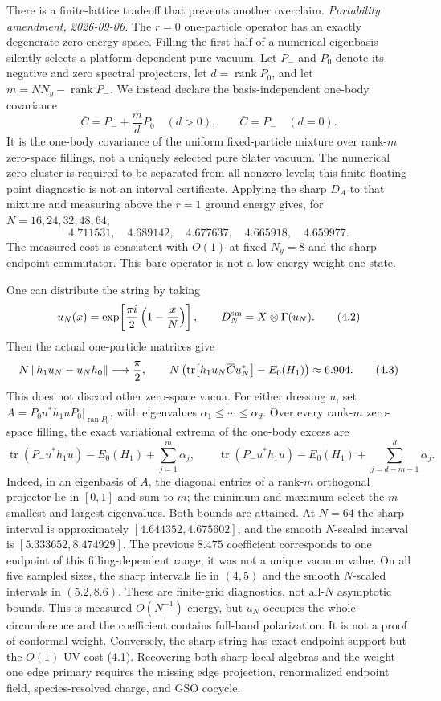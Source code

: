 There is a finite-lattice tradeoff that prevents another overclaim.
\emph{Portability amendment, 2026-09-06.}  The $r=0$ one-particle operator
has an exactly degenerate zero-energy space.  Filling the first half of a
numerical eigenbasis silently selects a platform-dependent pure vacuum.
Let $P_-$ and $P_0$ denote its negative and zero spectral projectors, let
$d=\operatorname{rank}P_0$, and let $m=N N_y-\operatorname{rank}P_-$.
We instead declare the basis-independent one-body covariance
\[
 \overline C=P_-+\frac md P_0
 \quad(d>0),\qquad \overline C=P_-\quad(d=0).
\]
It is the one-body covariance of the uniform fixed-particle mixture over
rank-$m$ zero-space fillings, not a uniquely selected pure Slater vacuum.
The numerical zero cluster is required to be separated from all nonzero
levels; this finite floating-point diagnostic is not an interval certificate.
Applying the sharp $D_A$ to that mixture and measuring above the $r=1$
ground energy gives, for $N=16,24,32,48,64$,
\[
 4.711531,\quad4.689142,\quad4.677637,\quad4.665918,\quad4.659977.
\tag{4.1}
\]
The measured cost is consistent with $O(1)$ at fixed $N_y=8$ and the sharp endpoint
commutator.  This bare operator is not a low-energy weight-one state.

One can distribute the string by taking
\[
 u_N(x)=\exp\!\left[\frac{\pi i}{2}\left(1-\frac{x}{N}\right)\right],
 \qquad D_N^{\rm sm}=X\otimes\Gamma(u_N).
\tag{4.2}
\]
Then the actual one-particle matrices give
\[
 N\left\lVert h_1u_N-u_Nh_0\right\rVert\longrightarrow\frac\pi2,\qquad
 N\left(\operatorname{tr}\!\left[h_1u_N\overline C u_N^*\right]
 -E_0(H_1)\right)\approx6.904.
\tag{4.3}
\]
This does not discard other zero-space vacua.  For either dressing $u$, set
$A=P_0u^*h_1uP_0|_{\operatorname{ran}P_0}$, with eigenvalues
$\alpha_1\leq\cdots\leq\alpha_d$.  Over every rank-$m$ zero-space filling,
the exact variational extrema of the one-body excess are
\[
 \operatorname{tr}(P_-u^*h_1u)-E_0(H_1)
 +\sum_{j=1}^{m}\alpha_j,
 \qquad
 \operatorname{tr}(P_-u^*h_1u)-E_0(H_1)
 +\sum_{j=d-m+1}^{d}\alpha_j.
\]
Indeed, in an eigenbasis of $A$, the diagonal entries of a rank-$m$
orthogonal projector lie in $[0,1]$ and sum to $m$; the minimum and maximum
select the $m$ smallest and largest eigenvalues.  Both bounds are attained.
At $N=64$ the sharp interval is approximately
$[4.644352,4.675602]$, and the smooth $N$-scaled interval is
$[5.333652,8.474929]$.  The previous $8.475$ coefficient corresponds to
one endpoint of this filling-dependent range; it was not a unique vacuum
value.  On all five sampled sizes, the sharp intervals lie in $(4,5)$ and
the smooth $N$-scaled intervals in $(5.2,8.6)$.  These are finite-grid
diagnostics, not all-$N$ asymptotic bounds.
This is measured $O(N^{-1})$ energy, but $u_N$ occupies the whole
circumference and the coefficient contains full-band polarization.  It is
not a proof of conformal weight.  Conversely, the sharp string has exact
endpoint support but the $O(1)$ UV cost (4.1).  Recovering both sharp local
algebras and the weight-one edge primary requires the missing edge projection,
renormalized endpoint field, species-resolved charge, and GSO cocycle.

